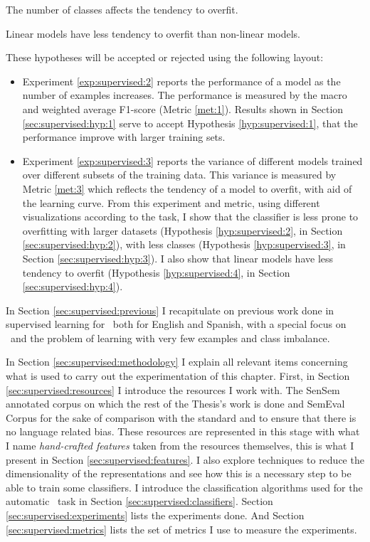\begin{subhypothesis}\label{hyp:supervised:3}
  The number of classes affects the tendency to overfit.
\end{subhypothesis}

\begin{subhypothesis}\label{hyp:supervised:4}
  Linear models have less tendency to overfit than non-linear models.
\end{subhypothesis}

These hypotheses will be accepted or rejected using the following layout:

\begin{itemize}
  \item Experiment \ref{exp:supervised:2} reports the performance of a model as
    the number of examples increases. The performance is measured by the macro
    and weighted average F1-score (Metric \ref{met:1}). Results
    shown in Section \ref{sec:supervised:hyp:1} serve to accept Hypothesis
    \ref{hyp:supervised:1}, that the performance improve with larger training
    sets.
  \item Experiment \ref{exp:supervised:3} reports the variance of different
    models trained over different subsets of the training data. This variance
    is measured by Metric \ref{met:3} which reflects the tendency of
    a model to overfit, with aid of the learning curve. From this experiment
    and metric, using different visualizations according to the task, I show
    that the classifier is less prone to overfitting with larger datasets
    (Hypothesis \ref{hyp:supervised:2}, in Section \ref{sec:supervised:hyp:2}),
    with less classes (Hypothesis \ref{hyp:supervised:3}, in Section
    \ref{sec:supervised:hyp:3}). I also show that linear models have less
    tendency to overfit (Hypothesis \ref{hyp:supervised:4}, in Section
    \ref{sec:supervised:hyp:4}).
\end{itemize}

In Section \ref{sec:supervised:previous} I recapitulate on previous work done
in supervised learning for \wsd~both for English and Spanish, with a special
focus on \vsd~and the problem of learning with very few examples and class
imbalance.

In Section \ref{sec:supervised:methodology} I explain all relevant items
concerning what is used to carry out the experimentation of this chapter.
First, in Section \ref{sec:supervised:resources} I introduce the resources I
work with. The SenSem annotated corpus on which the rest of the Thesis's work
is done and SemEval Corpus for the sake of comparison with the standard and to
ensure that there is no language related bias. These resources are represented
in this stage with what I name {\em hand-crafted features} taken from the
resources themselves, this is what I present in Section
\ref{sec:supervised:features}. I also explore techniques to reduce the
dimensionality of the representations and see how this is a necessary step to
be able to train some classifiers. I introduce the classification algorithms
used for the automatic \wsd~task in Section \ref{sec:supervised:classifiers}.
Section \ref{sec:supervised:experiments} lists the experiments done. And
Section \ref{sec:supervised:metrics} lists the set of metrics I use to measure
the experiments.

